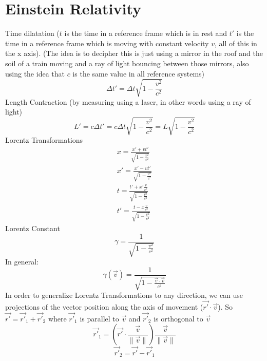 \documentclass{article}
\begin{document}
\section{Einstein Relativity}
Time dilatation ($t$ is the time in a reference frame which is in rest and $t'$ is the time in a reference frame which is moving with constant velocity $v$, all of this in the x axis). (The idea is to decipher this is just using a mirror in the roof and the soil of a train moving and a ray of light bouncing between those mirrors, also using the idea that $c$ is the same value in all reference systems)
\begin{equation}
  \Delta t' = \Delta t \sqrt{1 - \frac{v^2}{c^2}}
\end{equation}
Length Contraction (by measuring using a laser, in other words using a ray of light)
\begin{equation}
  L' = c\Delta t' = c\Delta t \sqrt{1 - \frac{v^2}{c^2}} = L\sqrt{1 - \frac{v^2}{c^2}}
\end{equation}
Lorentz Transformations
\begin{equation}
  \begin{split}
    x = \frac{x' + vt'}{\sqrt{1 - \frac{v^2}{c^2}}}\\
    x' = \frac{x' - vt'}{\sqrt{1 - \frac{v^2}{c^2}}}\\
      t = \frac{t' + x'\frac{v}{c^2}}{\sqrt{1 - \frac{v^2}{c^2}}}\\
      t' = \frac{t - x\frac{v}{c^2}}{\sqrt{1 - \frac{v^2}{c^2}}}
  \end{split}
\end{equation}
Lorentz Constant
\begin{equation}
  \gamma = \frac{1}{\sqrt{1-\frac{v^2}{c^2}}}
\end{equation}
In general:
\begin{equation}
  \gamma(\vec{v}) = \frac{1}{\sqrt{1-\frac{\vec{v}\cdot \vec{v}}{c^2}}}
\end{equation}
In order to generalize Lorentz Transformations to any direction, we can use projections of the vector position along the axis of movement ($\vec{r'} \cdot \vec{v}$). So $\vec{r'} = \vec{r'}_1 + \vec{r'}_2$ where $\vec{r'}_1$ is parallel to $\vec{v}$ and $\vec{r'}_2$ is orthogonal to $\vec{v}$
\begin{equation}
  \vec{r'}_1 = (\vec{r'} \cdot \frac{\vec{v}}{\|\vec{v}\|} )\frac{\vec{v}}{\|\vec{v}\|}
\end{equation}
\begin{equation}
  \vec{r'}_2 = \vec{r'} - \vec{r'}_1
\end{equation}
\end{document}
